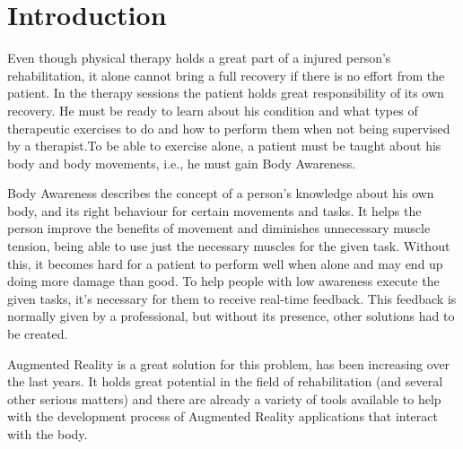 \documentclass[runningheads,a4paper]{llncs}
\begin{document}
\section{Introduction}


Even though physical therapy holds a great part of a injured person's rehabilitation, 
it alone cannot bring a full recovery if there is no effort from the patient. 
In the therapy sessions the patient holds great responsibility of its own recovery.
He must be ready to learn about his condition and what types of therapeutic exercises 
to do and how to perform them when not being supervised by a therapist.To be able to exercise alone, a patient 
must be taught about his body and body movements, i.e., he must gain Body Awareness.

Body Awareness describes the concept of a person's knowledge about his own body,
and its right behaviour for certain movements and tasks. It helps the person improve the benefits of
movement and diminishes unnecessary muscle tension, being able to use just the necessary muscles for the given task.
Without this, it becomes hard for a patient to perform well when alone and may end up doing more damage than good.
To help people with low awareness execute the given tasks, it's necessary for them to receive real-time feedback.
This feedback is normally given by a professional, but without its presence, other solutions had to be created.

Augmented Reality is a great solution for this problem, has been increasing over the last years.
It holds great potential in the field of rehabilitation (and several other serious matters) and 
there are already a variety of tools available to help with the development process of Augmented
Reality applications that interact with the body. %
\end{document}
